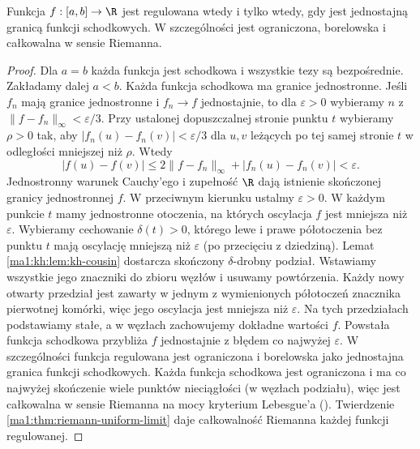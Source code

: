 \begin{twierdzenie}
Funkcja $f:[a,b]\to\R$ jest regulowana wtedy i tylko wtedy,
gdy jest jednostajną granicą funkcji schodkowych.
W szczególności jest ograniczona, borelowska i całkowalna
w sensie Riemanna.
\end{twierdzenie}
\begin{proof}
Dla $a=b$ każda funkcja jest schodkowa i wszystkie tezy
są bezpośrednie. Zakładamy dalej $a<b$.
Każda funkcja schodkowa ma granice jednostronne. Jeśli $f_n$ mają granice jednostronne i $f_n\to f$ jednostajnie, to dla $\varepsilon>0$ wybieramy $n$ z $\|f-f_n\|_\infty<\varepsilon/3$. Przy ustalonej dopuszczalnej stronie punktu $t$ wybieramy $\rho>0$ tak, aby $|f_n(u)-f_n(v)|<\varepsilon/3$ dla $u,v$ leżących po tej samej stronie $t$ w odległości mniejszej niż $\rho$. Wtedy
\[
 |f(u)-f(v)|\le 2\|f-f_n\|_\infty+|f_n(u)-f_n(v)|<\varepsilon.
\]
Jednostronny warunek Cauchy'ego i zupełność $\R$ dają istnienie skończonej granicy jednostronnej $f$. W przeciwnym kierunku ustalmy $\varepsilon>0$. W każdym punkcie $t$ mamy jednostronne otoczenia, na których oscylacja $f$ jest mniejsza niż $\varepsilon$. Wybieramy cechowanie $\delta(t)>0$, którego lewe i prawe półotoczenia bez punktu $t$ mają oscylację mniejszą niż $\varepsilon$ (po przecięciu z dziedziną). Lemat \ref{ma1:kh:lem:kh-cousin} dostarcza skończony $\delta$-drobny podział. Wstawiamy wszystkie jego znaczniki do zbioru węzłów i usuwamy powtórzenia. Każdy nowy otwarty przedział jest zawarty w jednym z wymienionych półotoczeń znacznika pierwotnej komórki, więc jego oscylacja jest mniejsza niż $\varepsilon$. Na tych przedziałach podstawiamy stałe, a w węzłach zachowujemy dokładne wartości $f$. Powstała funkcja schodkowa przybliża $f$ jednostajnie z błędem co najwyżej $\varepsilon$.
W szczególności funkcja regulowana jest ograniczona i borelowska jako jednostajna granica funkcji schodkowych. Każda funkcja schodkowa jest ograniczona i ma co
najwyżej skończenie wiele punktów nieciągłości
(w węzłach podziału), więc jest całkowalna w sensie
Riemanna na mocy kryterium Lebesgue'a
().
Twierdzenie \ref{ma1:thm:riemann-uniform-limit} daje
całkowalność Riemanna każdej funkcji regulowanej.
\end{proof}


